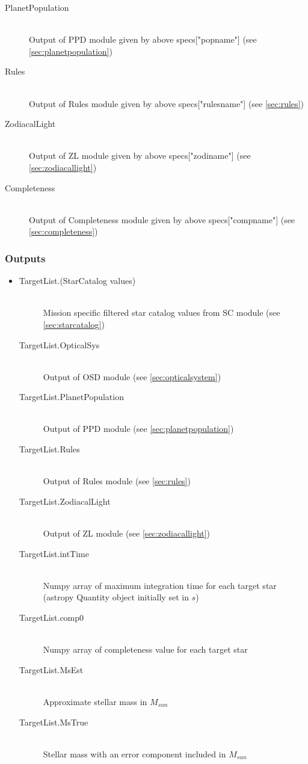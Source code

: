 \documentclass[cleanfoot]{asme2ej}
\begin{document}
\begin{itemize}
\begin{description}
        \item[PlanetPopulation] \hfill \\
        Output of PPD module given by above specs["popname"] (see \ref{sec:planetpopulation})
        \item[Rules] \hfill \\
        Output of Rules module given by above specs["rulesname"] (see \ref{sec:rules})
        \item[ZodiacalLight] \hfill \\
        Output of ZL module given by above specs["zodiname"] (see \ref{sec:zodiacallight})
        \item[Completeness] \hfill \\
        Output of Completeness module given by above specs["compname"] (see \ref{sec:completeness})
    \end{description}
\end{itemize}

\subsubsection*{Outputs}
\begin{itemize}
    \item 
    \begin{description}
        \item[TargetList.(StarCatalog values)] \hfill \\
        Mission specific filtered star catalog values from SC module (see \ref{sec:starcatalog})
        \item[TargetList.OpticalSys] \hfill \\
        Output of OSD module (see \ref{sec:opticalsystem})
        \item[TargetList.PlanetPopulation] \hfill \\
        Output of PPD module (see \ref{sec:planetpopulation})
        \item[TargetList.Rules] \hfill \\
        Output of Rules module (see \ref{sec:rules})
        \item[TargetList.ZodiacalLight] \hfill \\
        Output of ZL module (see \ref{sec:zodiacallight})
        \item[TargetList.intTime] \hfill \\
        Numpy array of maximum integration time for each target star (astropy Quantity object initially set in $ s $)
        \item[TargetList.comp0] \hfill \\
        Numpy array of completeness value for each target star
        \item[TargetList.MsEst] \hfill \\
        Approximate stellar mass in $ M_{sun} $
        \item[TargetList.MsTrue] \hfill \\
        Stellar mass with an error component included in $ M_{sun} $
    \end{description}
\end{itemize}
\end{document}
